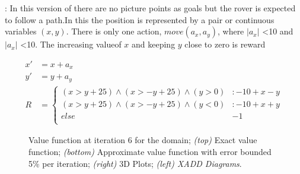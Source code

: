 \MarsRoverBi: In this version of \MarsRover there are no picture points as goals but the rover is expected to follow a path.In this the position is represented by a pair or continuous variables $(x,y)$. There is only one action, $move(a_x,a_y)$, where $|a_x|$ <10 and $|a_x|$ <10. The increasing valueof $x$ and keeping $y$ close to zero is reward 

{\footnotesize
\begin{align*}
x' &= x +a_x\\
y' &= y +a_y\\
R & = \begin{cases}
(x > y +25) \wedge (x > - y  +25) \wedge (y >0) &: -10 + x -y\\
(x > y +25) \wedge (x > - y  +25) \wedge (y <0) &: -10 + x +y\\
else & -1\\
\end{cases}
\end{align*}}

\begin{figure}[tbp!]
\centering
{}

\caption {\footnotesize
	Value function at iteration 6 for the \MarsRoverBi domain;
	{\it (top)} Exact value function; 	{\it (bottom)} Approximate value function with error bounded 5\% per iteration;
	{\it (right)} 3D Plots; {\it (left) XADD Diagrams}.
}
\label{fig:Mars2DV6}
\vspace{-5mm}
\end{figure}

